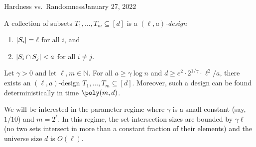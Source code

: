 \begin{lecture}{2}{Hardness vs.\ Randomness}{January 27, 2022}
\begin{definition}
  A collection of subsets $T_1, \dots, T_m \subseteq [d]$ is a \emph{$(\ell, a)$-design}
	\begin{enumerate}
    \item $\lvert S_i\rvert = \ell$ for all $i$, and
		\item $\lvert S_i \cap S_j\rvert < a$ for all $i \ne j$.
	\end{enumerate}
\end{definition}

\begin{proposition}\label{prop:design}
  Let $\gamma > 0 $ and let $\ell, m \in \mathbb{N}$. For all $a \ge \gamma
  \log{n}$ and $d \ge e^2 \cdot 2^{1/\gamma} \cdot \ell^2/a$, there exists an
  $(\ell, a)$-design $T_1, \dots, T_m \subseteq [d]$. Moreover, such a design
  can be found deterministically in time $\poly(m, d)$.
\end{proposition}

We will be interested in the parameter regime where $\gamma$ is a small
constant (say, $1/10$) and $m = 2^\ell$. In this regime, the set intersection
sizes are bounded by $\gamma \ell$ (no two sets intersect in more than a
constant fraction of their elements) and the universe size $d$ is $O(\ell)$.


\end{lecture}
